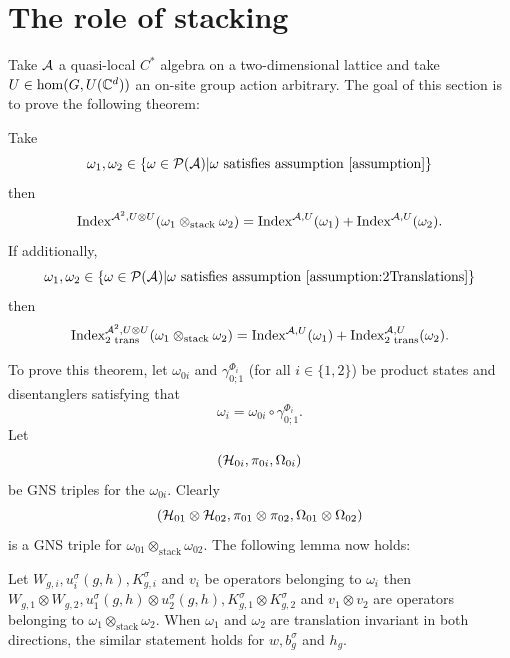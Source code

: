 \documentclass[11pt,a4paper,twoside]{article}
\numberwithin{equation}{section}
\begin{document}
	\section{The role of stacking}\label{sec:the-role-of-stacking}
	Take $\AA$ a quasi-local $C^*$ algebra on a two-dimensional lattice and take $U\in\hom(G,U(\CC^d))$ an on-site group action arbitrary. The goal of this section is to prove the following theorem:
	\begin{theorem}\label{th:IndexMorphismUnderStacking}
		Take
		\begin{equation}
			\omega_1,\omega_2\in\{\omega\in\PP(\AA)|\omega\text{ satisfies assumption \ref{assumption}}\}
		\end{equation}
		then
		\begin{equation}\label{eq:IndexMorphismUnderStacking}
			\textrm{Index}^{\AA^2,U\otimes U}(\omega_1\otimes_{\text{stack}}\omega_2)=\textrm{Index}^{\AA,U}(\omega_1)+\textrm{Index}^{\AA,U}(\omega_2).
		\end{equation}
		If additionally,
		\begin{equation}
			\omega_1,\omega_2\in\{\omega\in\PP(\AA)|\omega\text{ satisfies assumption \ref{assumption:2Translations}}\}
		\end{equation}
		then
		\begin{equation}\label{eq:IndexMorphismUnderStackingTwoTranslations}
			\textrm{Index}^{\AA^2,U\otimes U}_{\text{2 trans}}(\omega_1\otimes_{\text{stack}}\omega_2)=\textrm{Index}^{\AA,U}(\omega_1)+\textrm{Index}^{\AA,U}_{\text{2 trans}}(\omega_2).
		\end{equation}
	\end{theorem}
	To prove this theorem, let $\omega_{0i}$ and $\gamma_{0;1}^{\Phi_i}$ (for all $i\in\{1,2\}$) be product states and disentanglers satisfying that
	\begin{equation}
		\omega_i=\omega_{0i}\circ\gamma_{0;1}^{\Phi_i}.
	\end{equation}
	Let
	\begin{equation}
		(\HH_{0i},\pi_{0i},\Omega_{0i})
	\end{equation}
	be GNS triples for the $\omega_{0i}$. Clearly
	\begin{equation}
		(\HH_{01}\otimes\HH_{02},\pi_{01}\otimes\pi_{02},\Omega_{01}\otimes\Omega_{02})
	\end{equation}
	is a GNS triple for $\omega_{01}\otimes_{\text{stack}}\omega_{02}$. The following lemma now holds:
	\begin{lemma}
		Let $W_{g,i},u^\sigma_i(g,h),K_{g,i}^\sigma$ and $v_{i}$ be operators belonging to $\omega_i$ then $W_{g,1}\otimes W_{g,2},u^\sigma_1(g,h)\otimes u^\sigma_2(g,h),K_{g,1}^\sigma\otimes K_{g,2}^\sigma$ and $v_{1}\otimes v_{2}$ are operators belonging to $\omega_1\otimes_{\text{stack}}\omega_2$. When $\omega_1$ and $\omega_2$ are translation invariant in both directions, the similar statement holds for $w,b_g^\sigma$ and $h_g$.
	\end{lemma}
\end{document}
